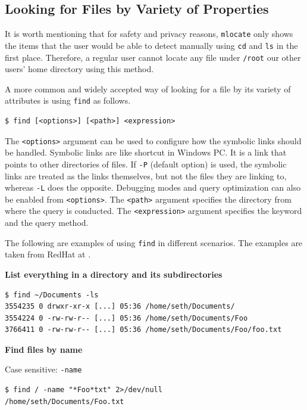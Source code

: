 \subsection{Looking for Files by Variety of Properties}

It is worth mentioning that for safety and privacy reasons, \verb|mlocate| only shows the items that the user would be able to detect manually using \verb|cd| and \verb|ls| in the first place. Therefore, a regular user cannot locate any file under \verb|/root| our other users' home directory using this method.

A more common and widely accepted way of looking for a file by its variety of attributes is using \verb|find| as follows.
\begin{lstlisting}
$ find [<options>] [<path>] <expression>
\end{lstlisting}

The \verb|<options>| argument can be used to configure how the symbolic links should be handled. Symbolic links are like shortcut in Windows PC. It is a link that points to other directories of files. If \verb|-P| (default option) is used, the symbolic links are treated as the links themselves, but not the files they are linking to, whereas \verb|-L| does the opposite. Debugging modes and query optimization can also be enabled from \verb|<options>|. The \verb|<path>| argument specifies the directory from where the query is conducted. The \verb|<expression>| argument specifies the keyword and the query method.

The following are examples of using \verb|find| in different scenarios. The examples are taken from RedHat at \cite{redhat2022find}.

\vspace{0.1in}
\noindent \textbf{List everything in a directory and its subdirectories}
\vspace{0.1in}

\begin{lstlisting}
$ find ~/Documents -ls
3554235 0 drwxr-xr-x [...] 05:36 /home/seth/Documents/
3554224 0 -rw-rw-r-- [...] 05:36 /home/seth/Documents/Foo
3766411 0 -rw-rw-r-- [...] 05:36 /home/seth/Documents/Foo/foo.txt
\end{lstlisting}

\vspace{0.1in}
\noindent \textbf{Find files by name}
\vspace{0.1in}

Case sensitive: \verb|-name|
\begin{lstlisting}
$ find / -name "*Foo*txt" 2>/dev/null
/home/seth/Documents/Foo.txt
\end{lstlisting}

